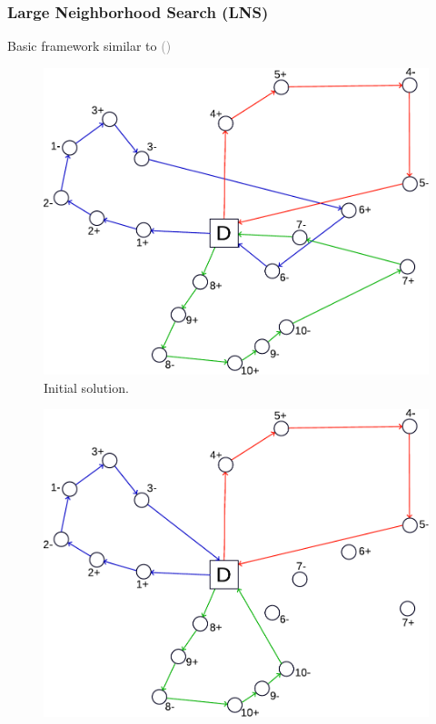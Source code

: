 \documentclass[aspectratio=1610]{beamer}
\begin{document}
\begin{frame}
  \frametitle{Large Neighborhood Search (LNS)}

  Basic framework similar to {\textcolor{gray}{(\cite{Ropke:2006})}}

\begin{minipage}[t]{0.3\linewidth}
\begin{figure}
	\centering
	\includegraphics[width=\textwidth]{graphics/lns-initial-solution-new}
	\caption{Initial solution.}
\end{figure}
\end{minipage}%
\hfill%
\begin{minipage}[t]{.3\textwidth}
\begin{figure}
	\centering
	\includegraphics[width=\textwidth]{graphics/lns-destroy-solution-new} 

\end{figure}
\end{minipage}
\end{frame}
\end{document}
